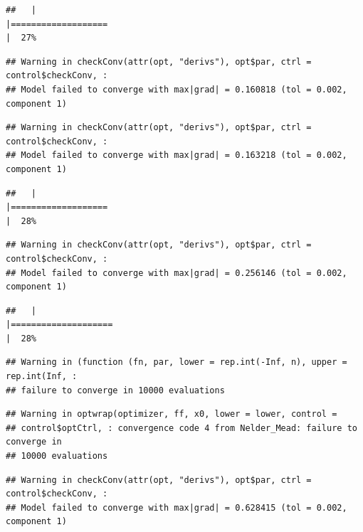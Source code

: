 \documentclass[
  12pt,
]{book}
\begin{document}
\begin{verbatim}
##   |                                                                              |===================                                                   |  27%
\end{verbatim}

\begin{verbatim}
## Warning in checkConv(attr(opt, "derivs"), opt$par, ctrl = control$checkConv, :
## Model failed to converge with max|grad| = 0.160818 (tol = 0.002, component 1)
\end{verbatim}

\begin{verbatim}
## Warning in checkConv(attr(opt, "derivs"), opt$par, ctrl = control$checkConv, :
## Model failed to converge with max|grad| = 0.163218 (tol = 0.002, component 1)
\end{verbatim}

\begin{verbatim}
##   |                                                                              |===================                                                   |  28%
\end{verbatim}

\begin{verbatim}
## Warning in checkConv(attr(opt, "derivs"), opt$par, ctrl = control$checkConv, :
## Model failed to converge with max|grad| = 0.256146 (tol = 0.002, component 1)
\end{verbatim}

\begin{verbatim}
##   |                                                                              |====================                                                  |  28%
\end{verbatim}

\begin{verbatim}
## Warning in (function (fn, par, lower = rep.int(-Inf, n), upper = rep.int(Inf, :
## failure to converge in 10000 evaluations
\end{verbatim}

\begin{verbatim}
## Warning in optwrap(optimizer, ff, x0, lower = lower, control =
## control$optCtrl, : convergence code 4 from Nelder_Mead: failure to converge in
## 10000 evaluations
\end{verbatim}

\begin{verbatim}
## Warning in checkConv(attr(opt, "derivs"), opt$par, ctrl = control$checkConv, :
## Model failed to converge with max|grad| = 0.628415 (tol = 0.002, component 1)
\end{verbatim}
\end{document}
